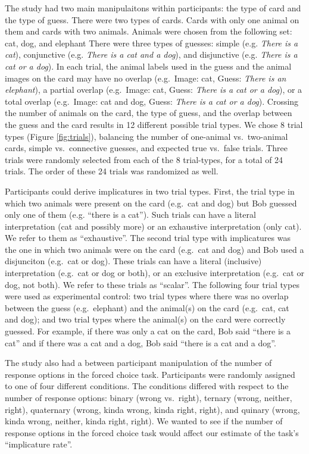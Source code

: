 \documentclass[floatsintext,man]{apa6}
\theoremstyle{definition}
\theoremstyle{definition}
\theoremstyle{definition}
\theoremstyle{remark}
\begin{document}
The study had two main manipulaitons within participants: the type of
card and the type of guess. There were two types of cards. Cards with
only one animal on them and cards with two animals. Animals were chosen
from the following set: cat, dog, and elephant There were three types of
guesses: simple (e.g. \emph{There is a cat}), conjunctive (e.g.
\emph{There is a cat and a dog}), and disjunctive (e.g. \emph{There is a
cat or a dog}). In each trial, the animal labels used in the guess and
the animal images on the card may have no overlap (e.g.~Image: cat,
Guess: \emph{There is an elephant}), a partial overlap (e.g.~Image: cat,
Guess: \emph{There is a cat or a dog}), or a total overlap (e.g.~Image:
cat and dog, Guess: \emph{There is a cat or a dog}). Crossing the number
of animals on the card, the type of guess, and the overlap between the
guess and the card results in 12 different possible trial types. We
chose 8 trial types (Figure \ref{fig:trials}), balancing the number of
one-animal vs.~two-animal cards, simple vs.~connective guesses, and
expected true vs.~false trials. Three trials were randomly selected from
each of the 8 trial-types, for a total of 24 trials. The order of these
24 trials was randomized as well.

Participants could derive implicatures in two trial types. First, the
trial type in which two animals were present on the card (e.g.~cat and
dog) but Bob guessed only one of them (e.g. \enquote{there is a cat}).
Such trials can have a literal interpretation (cat and possibly more) or
an exhaustive interpretation (only cat). We refer to them as
\enquote{exhaustive}. The second trial type with implicatures was the
one in which two animals were on the card (e.g.~cat and dog) and Bob
used a disjunciton (e.g.~cat or dog). These trials can have a literal
(inclusive) interpretation (e.g.~cat or dog or both), or an exclusive
interpretation (e.g.~cat or dog, not both). We refer to these trials as
\enquote{scalar}. The following four trial types were used as
experimental control: two trial types where there was no overlap between
the guess (e.g.~elephant) and the animal(s) on the card (e.g.~cat, cat
and dog); and two trial types where the animal(s) on the card were
correctly guessed. For example, if there was only a cat on the card, Bob
said \enquote{there is a cat} and if there was a cat and a dog, Bob said
\enquote{there is a cat and a dog}.

The study also had a between participant manipulation of the number of
response options in the forced choice task. Participants were randomly
assigned to one of four different conditions. The conditions differed
with respect to the number of response options: binary (wrong
vs.~right), ternary (wrong, neither, right), quaternary (wrong, kinda
wrong, kinda right, right), and quinary (wrong, kinda wrong, neither,
kinda right, right). We wanted to see if the number of response options
in the forced choice task would affect our estimate of the task's
\enquote{implicature rate}.
\end{document}
